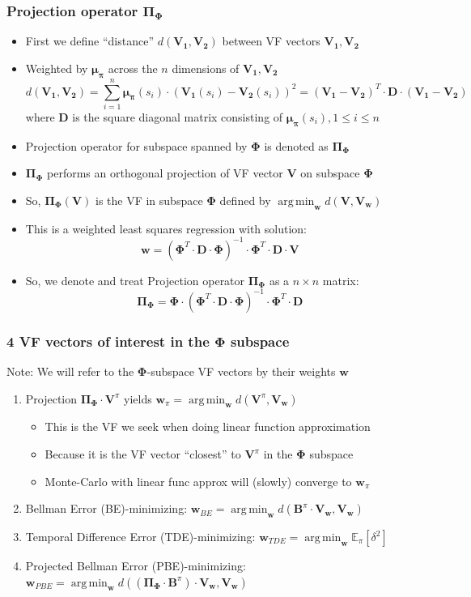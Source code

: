 \documentclass[handout]{beamer}
\DeclareMathOperator*{\argmin}{arg\,min}
\newcommand{\vw}{\bm{V_w}}
\newcommand{\vpi}{\bm{V}^{\pi}}
\newcommand{\bphi}{\bm{\Phi}}
\newcommand{\bb}{\bm{B}^{\pi}}
\newcommand{\bpi}{\bm{\Pi_{\Phi}}}
\newcommand{\bmu}{\bm{\mu_{\pi}}}
\newcommand{\bv}{\bm{V}}
\newcommand{\bd}{\bm{D}}
\newcommand{\bw}{\bm{w}}
\begin{document}
\begin{frame}
\frametitle{Projection operator $\bpi$}
\pause
\begin{itemize}[<+->]
\item First we define ``distance'' $d(\bm{V_1}, \bm{V_2})$ between VF vectors $\bm{V_1}, \bm{V_2}$
\item Weighted by $\bmu$ across the $n$ dimensions of $\bm{V_1}, \bm{V_2}$
$$d(\bm{V_1}, \bm{V_2}) = \sum_{i=1}^n \bmu(s_i) \cdot  (\bm{V_1}(s_i) - \bm{V_2}(s_i))^2 =  (\bm{V_1} - \bm{V_2})^T \cdot \bd \cdot (\bm{V_1} - \bm{V_2})$$
where $\bd$ is the square diagonal matrix consisting of $\bmu(s_i), 1 \leq i \leq n$
\item Projection operator for subspace spanned by $\bphi$ is denoted as $\bpi$
\item $\bpi$ performs an orthogonal projection of VF vector $\bv$ on subspace $\bphi$
\item So, $\bpi (\bv)$ is the VF in subspace $\bphi$ defined by $\argmin_{\bw} d(\bv, \vw)$
\item This is a weighted least squares regression with solution:
$$\bw = (\bphi^T \cdot \bd \cdot \bphi)^{-1} \cdot \bphi^T \cdot \bd \cdot \bv$$
\item So, we denote and treat Projection operator $\bpi$ as a $n \times n$ matrix:
$$\bpi = \bphi \cdot (\bphi^T \cdot \bd \cdot \bphi)^{-1} \cdot \bphi^T \cdot \bd$$
\end{itemize}
\end{frame}

\begin{frame}
\frametitle{4 VF vectors of interest in the $\bphi$ subspace}
Note: We will refer to the $\bphi$-subspace VF vectors by their weights $\bw$
\pause
\begin{enumerate}[<+->]
\item Projection $\bpi \cdot \vpi$ yields $\bm{w}_{\pi} = \argmin_{\bw} d(\vpi, \vw)$
\begin{itemize}[<+->]
\item This is the VF we seek when doing linear function approximation
\item Because it is the VF vector ``closest'' to $\vpi$ in the $\bphi$ subspace
\item Monte-Carlo with linear func approx will (slowly) converge to $\bw_{\pi}$
\end{itemize}
\item Bellman Error (BE)-minimizing: $\bm{w}_{BE} = \argmin_{\bw} d(\bb \cdot \vw, \vw)$
\item Temporal Difference Error (TDE)-minimizing: $\bm{w}_{TDE} = \argmin_{\bw} \mathbb{E}_{\pi} [\delta^2]$
\item Projected Bellman Error (PBE)-minimizing: $\bm{w}_{PBE} = \argmin_{\bw} d((\bpi \cdot \bb) \cdot \vw, \vw)$
\end{enumerate}
\end{frame}
\end{document}
